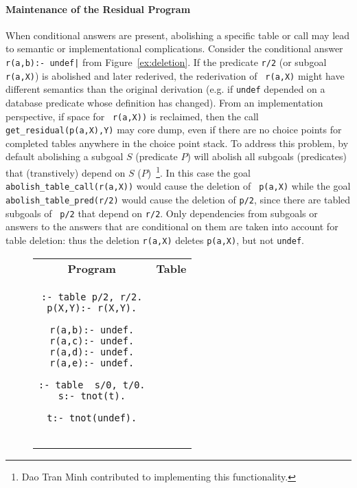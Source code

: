 \begin{description}
\paragraph{Maintenance of the Residual Program}
When conditional answers are present, abolishing a specific table or
call may lead to semantic or implementational complications.  Consider
the conditional answer {\tt r(a,b):- undef|} from
Figure~\ref{ex:deletion}.  If the predicate {\tt r/2} (or subgoal {\tt
  r(a,X)}) is abolished and later rederived, the rederivation of {\tt
  r(a,X)} might have different semantics than the original derivation
(e.g. if {\tt undef} depended on a database predicate whose definition
has changed).  From an implementation perspective, if space for {\tt
  r(a,X))} is reclaimed, then the call {\tt get\_residual(p(a,X),Y)}
may core dump, even if there are no choice points for completed tables
anywhere in the choice point stack.  To address this problem, by
default abolishing a subgoal $S$ (predicate $P$) will abolish all
subgoals (predicates) that (transtively) depend on $S$
($P$)~\footnote{Dao Tran Minh contributed to implementing this
  functionality.}.  In this case the goal {\tt
  abolish\_table\_call(r(a,X))} would cause the deletion of {\tt
  p(a,X)} while the goal {\tt abolish\_table\_pred(r/2)} would cause
the deletion of {\tt p/2}, since there are tabled subgoals of {\tt
  p/2} that depend on {\tt r/2}.  Only dependencies from subgoals or
answers to the answers that are conditional on them are taken into
account for table deletion: thus the deletion {\tt r(a,X)} deletes
{\tt p(a,X)}, but not {\tt undef}.

\begin{figure}[htb]
\begin{center}
\begin{tabular}{cc}\hline \hline
\rule[-2ex]{0ex}{5ex} \textbf{Program} & \textbf{Table} \\
\begin{minipage}{14.5em}
\begin{verbatim}
:- table p/2, r/2.
p(X,Y):- r(X,Y).

r(a,b):- undef.
r(a,c):- undef.
r(a,d):- undef.
r(a,e):- undef.

:- table  s/0, t/0.
s:- tnot(t).

t:- tnot(undef).


\end{verbatim}
\end{minipage}
\end{tabular}
\end{center}
\end{figure}
\end{description}

